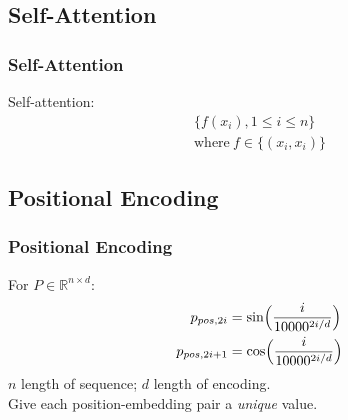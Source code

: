 \documentclass[]{beamer}
\newcommand{\bb}[1]{\mathbb{#1}}
\newcommand{\x}{\times}
\begin{document}
\subsection{Self-Attention}
\begin{frame}
    \frametitle{Self-Attention}
    Self-attention: 
    \begin{align*}
        \{f(x_i), 1 \le i \le n\}  \\
        \text{where}~f \in \{(x_i, x_i)\}
    \end{align*}
\end{frame}

\subsection{Positional Encoding}
\begin{frame}
    \frametitle{Positional Encoding}
    For $P \in \bb{R}^{n\x d}$:
    \begin{align*}
        p_{pos,2i} &= \sin \Bigl(\frac{i}{10000^{2i/d}}\Bigr) \\
        p_{pos,2i+1} &= \cos \Bigl(\frac{i}{10000^{2i/d}}\Bigr)
    \end{align*}
    $n$\: length of sequence; $d$\: length of encoding. \\
    Give each position-embedding pair a \emph{unique} value.
\end{frame}
\end{document}
